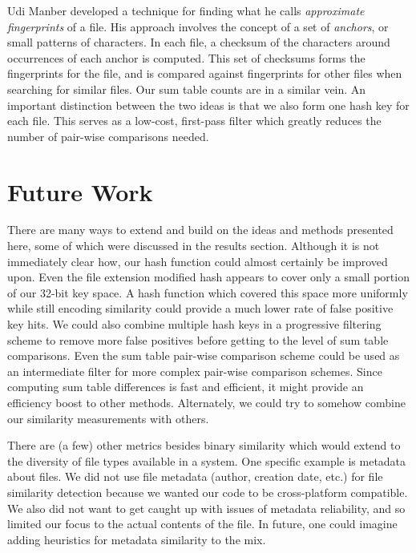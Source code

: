 \documentclass[10pt, twocolumn]{article}
\begin{document}
Udi Manber \cite{manber} developed a technique for finding what he calls \emph{approximate fingerprints} of a file. His approach involves the concept of a set of \emph{anchors}, or small patterns of characters. In each file, a checksum of the characters around occurrences of each anchor is computed. This set of checksums forms the fingerprints for the file, and is compared against fingerprints for other files when searching for similar files. Our sum table counts are in a similar vein. An important distinction between the two ideas is that we also form one hash key for each file.  This serves as a low-cost, first-pass filter which greatly reduces the number of pair-wise comparisons needed.



\section{Future Work}

There are many ways to extend and build on the ideas and methods presented here, some of which were discussed in the results section.  Although it is not immediately clear how, our hash function could almost certainly be improved upon.  Even the file extension modified hash appears to cover only a small portion of our 32-bit key space.  A hash function which covered this space more uniformly while still encoding similarity could provide a much lower rate of false positive key hits.  We could also combine multiple hash keys in a progressive filtering scheme to remove more false positives before getting to the level of sum table comparisons.  Even the sum table pair-wise comparison scheme could be used as an intermediate filter for more complex pair-wise comparison schemes.  Since computing sum table differences is fast and efficient, it might provide an efficiency boost to other methods.  Alternately, we could try to somehow combine our similarity measurements with others.

There are (a few) other metrics besides binary similarity which would extend to the diversity of file types available in a system. One specific example is metadata about files. We did not use file metadata (author, creation date, etc.) for file similarity detection because we wanted our code to be cross-platform compatible. We also did not want to get caught up with issues of metadata reliability, and so limited our focus to the actual contents of the file. In future, one could imagine adding heuristics for metadata similarity to the mix. 
\end{document}
